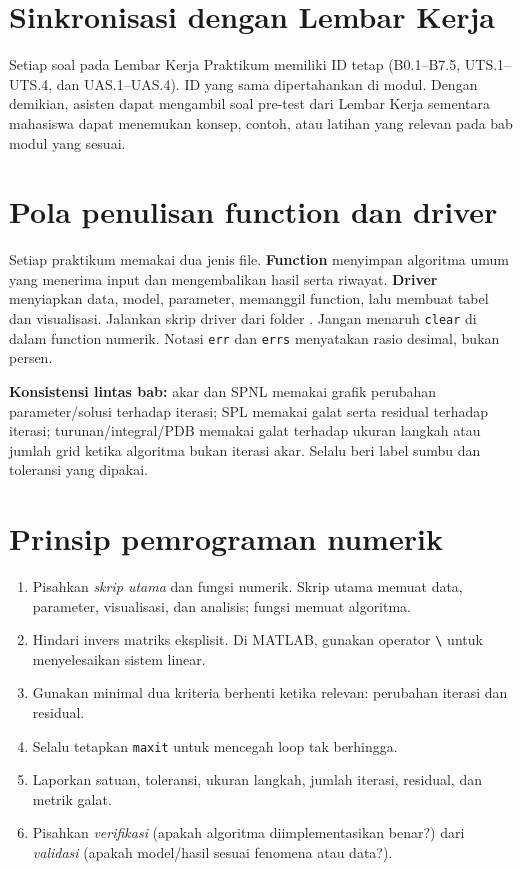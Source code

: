\documentclass[book,english,noindex,lean,nobackpage,nocopyright,noupdate,nofiglist,notablist]{enacom}
\begin{document}
\section*{Sinkronisasi dengan Lembar Kerja}
Setiap soal pada Lembar Kerja Praktikum memiliki ID tetap (B0.1--B7.5, UTS.1--UTS.4, dan UAS.1--UAS.4). ID yang sama dipertahankan di modul. Dengan demikian, asisten dapat mengambil soal pre-test dari Lembar Kerja sementara mahasiswa dapat menemukan konsep, contoh, atau latihan yang relevan pada bab modul yang sesuai.

\section*{Pola penulisan function dan driver}
Setiap praktikum memakai dua jenis file. \textbf{Function} menyimpan algoritma umum yang menerima input dan mengembalikan hasil serta riwayat. \textbf{Driver} menyiapkan data, model, parameter, memanggil function, lalu membuat tabel dan visualisasi. Jalankan skrip driver dari folder . Jangan menaruh \texttt{clear} di dalam function numerik. Notasi \texttt{err} dan \texttt{errs} menyatakan rasio desimal, bukan persen.

\noindent\textbf{Konsistensi lintas bab:} akar dan SPNL memakai grafik perubahan parameter/solusi terhadap iterasi; SPL memakai galat serta residual terhadap iterasi; turunan/integral/PDB memakai galat terhadap ukuran langkah atau jumlah grid ketika algoritma bukan iterasi akar. Selalu beri label sumbu dan toleransi yang dipakai.

\section*{Prinsip pemrograman numerik}
\begin{enumerate}
\item Pisahkan \textit{skrip utama} dan fungsi numerik. Skrip utama memuat data, parameter, visualisasi, dan analisis; fungsi memuat algoritma.
\item Hindari invers matriks eksplisit. Di MATLAB, gunakan operator \texttt{\textbackslash} untuk menyelesaikan sistem linear.
\item Gunakan minimal dua kriteria berhenti ketika relevan: perubahan iterasi dan residual.
\item Selalu tetapkan \texttt{maxit} untuk mencegah loop tak berhingga.
\item Laporkan satuan, toleransi, ukuran langkah, jumlah iterasi, residual, dan metrik galat.
\item Pisahkan \textit{verifikasi} (apakah algoritma diimplementasikan benar?) dari \textit{validasi} (apakah model/hasil sesuai fenomena atau data?).
\end{enumerate}
\end{document}
